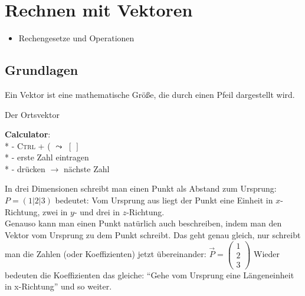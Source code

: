 \chapter{Rechnen mit Vektoren}
\begin{inhalt}
  \begin{itemize}
    \item Rechengesetze und Operationen
  \end{itemize}
\end{inhalt}

\section{Grundlagen}
Ein Vektor ist eine mathematische Größe, die durch einen Pfeil dargestellt wird.

\begin{bla}{Der Ortsvektor}
   \begin{marginfigure}[5em]
    \begin{tcolorbox}[colback=white!95!black,colframe=white!75!black,title=CAS:,arc=0mm]
      \begin{scriptsize}
        \textbf{Calculator}: \\*
          - \textsc{Ctrl} + \textsc{(} \( \leadsto \) \( [ \ ] \) \\*
          - erste Zahl eintragen \\*
          - \keys{\return} drücken \( \to \) nächste Zahl
      \end{scriptsize}
    \end{tcolorbox}
  \end{marginfigure}
  In drei Dimensionen schreibt man einen Punkt als Abstand zum Ursprung: $P = (1|2|3)$ bedeutet: Vom Ursprung aus liegt der Punkt eine Einheit in $x$- Richtung, zwei in $y$- und drei in $z$-Richtung.
  \\
  Genauso kann man einen Punkt natürlich auch beschreiben, indem man den Vektor vom Ursprung zu dem Punkt schreibt.
  Das geht genau gleich, nur schreibt man die Zahlen (oder Koeffizienten) jetzt übereinander:
  $\vec{P} = \begin{pmatrix} 1\\2\\3 \end{pmatrix}$
  Wieder bedeuten die Koeffizienten das gleiche:
  "`Gehe vom Ursprung eine Längeneinheit in x-Richtung"' und so weiter.
\end{bla}

